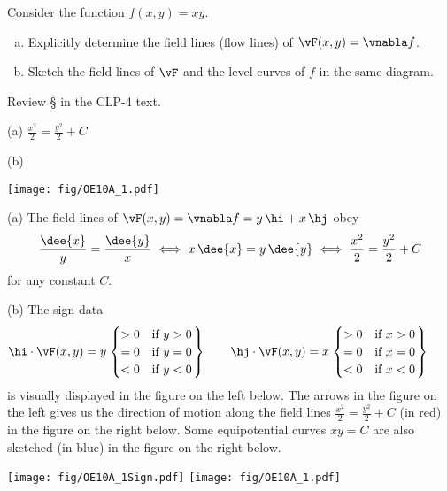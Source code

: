 \begin{question}[M317 2010A] %
Consider the function $f(x,y) = xy$.
\begin{enumerate}[(a)]
\item
Explicitly determine the field lines (flow lines) of 
$\vF(x,y) = \vnabla f$.
\item
Sketch the field lines of $\vF$ and the level curves of $f$ in the same diagram.
\end{enumerate}
\end{question}

\begin{hint} 
Review \S{} in the CLP-4 text.
\end{hint}

\begin{answer} 
(a) $\frac{x^2}{2} =\frac{y^2}{2} +C$

(b) 
  \begin{center}
       \texttt{[image: fig/OE10A\_1.pdf]}
  \end{center}

\end{answer}

\begin{solution} (a) The field lines of $\vF(x,y) = \vnabla f
=y\,\hi + x\,\hj$ obey
\begin{align*}
\frac{\dee{x}}{y} = \frac{\dee{y}}{x}
\iff x\,\dee{x} = y\,\dee{y}
\iff \frac{x^2}{2} =\frac{y^2}{2} +C
\end{align*}
for any constant $C$.

\noindent (b)
The sign data
\begin{align*}
\hi\cdot\vF(x,y) = y
    \left.\begin{cases}
             >0 &\text{if $y>0$} \\
             =0 &\text{if $y=0$} \\
             <0 &\text{if $y<0$} 
       \end{cases}\right\}\qquad
\hj\cdot\vF(x,y) = x
    \left.\begin{cases}
             >0 &\text{if $x>0$} \\
             =0 &\text{if $x=0$} \\
             <0 &\text{if $x<0$} 
       \end{cases}\right\}\qquad
\end{align*}
is visually displayed in the figure on the left below. The arrows in the
figure on the left gives us the direction of motion along 
the field lines $\frac{x^2}{2} =\frac{y^2}{2} +C$ (in red) in the 
figure on the right below. Some equipotential curves $xy=C$ are 
also sketched (in blue) in the figure on the right below.

  \begin{center}
       \texttt{[image: fig/OE10A\_1Sign.pdf]}\qquad\qquad
       \texttt{[image: fig/OE10A\_1.pdf]}
  \end{center}


\end{solution}

